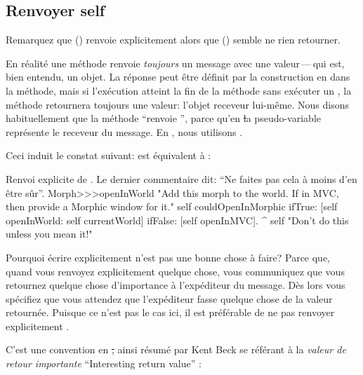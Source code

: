 \documentclass[a4paper,10pt,twoside]{book}
\begin{document}
\subsection{Renvoyer self}

Remarquez que  () renvoie explicitement  alors que  () semble ne rien retourner.

En r\'ealit\'e une m\'ethode renvoie \emph{toujours} un message avec une valeur\,---\,qui est, bien entendu, un objet.
La r\'eponse peut \^etre d\'efinit par la construction en \ct{^} dans la m\'ethode, mais si l'ex\'ecution atteint la fin de la m\'ethode sans ex\'ecuter un \ct{^}, la m\'ethode retournera toujours une valeur: l'objet receveur lui-m\^eme.
Nous disons habituellement que la m\'ethode ``renvoie \self'', parce qu'en
\st la pseudo-variable \self repr\'esente le receveur du message. En , nous utilisons .

Ceci induit le constat suivant:  est \'equivalent \`a \mbox{:}

\begin{method}[openInWorldReturnSelf]{Renvoi explicite de \mbox{\self.} Le dernier commentaire dit: ``Ne faites pas cela \`a moins d'en \^etre s\^ur''.}
Morph>>>openInWorld
	"Add this morph to the world.  If in MVC,
	then provide a Morphic window for it."
	self couldOpenInMorphic
		ifTrue: [self openInWorld: self currentWorld]
		ifFalse: [self openInMVC].
	^ self		"Don't do this unless you mean it!"
\end{method}

Pourquoi \'ecrire  explicitement n'est pas une bonne chose \`a faire?
Parce que, quand vous renvoyez explicitement quelque chose, vous communiquez
que vous retournez quelque chose d'importance \`a l'exp\'editeur du message.
D\`es lors vous sp\'ecifiez que vous attendez que l'exp\'editeur fasse quelque chose de la valeur retourn\'ee.
Puisque ce n'est pas le cas ici, il est pr\'ef\'erable de ne pas renvoyer explicitement \self.

C'est une convention en \st, ainsi r\'esum\'e par Kent Beck se r\'ef\'erant \`a la \emph{valeur de retour importante} ``Interesting return value'' \cite{Beck97a}:
\end{document}
